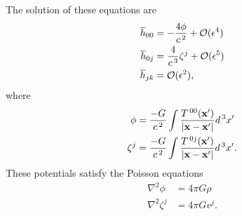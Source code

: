 The solution of these equations are
\begin{subequations}
	\begin{align}
	\label{eq: newpotentialandh00}
 			\overline h_{00} &= -\frac{4\phi}{c^{\hspace{0.05cm}2}} + \mathcal{O}(\epsilon^4) \\
 			\overline h_{0j} &= \frac{4}{c^{\hspace{0.05cm}3}}\zeta^j + \mathcal{O}(\epsilon^5) \\
  			\overline h_{jk} &= \mathcal{O}(\epsilon^2),
	\end{align}
\end{subequations}
where
\begin{subequations}
\begin{align}
 			\phi &= \frac{-G}{c^{\hspace{0.05cm}2}}\int \frac{T^{\hspace{0.05cm}00}(\mathbf{x'})}{|\mathbf{x}-\mathbf{x'}|}d^{\hspace{0.05cm}3}x'\\
	\label{eq: vector potential}
 			\zeta^j &= \frac{-G}{c^{\hspace{0.05cm}2}}\int \frac{T^{\hspace{0.05cm}0j}(\mathbf{x'})}{|\mathbf{x}-\mathbf{x'}|}d^{\hspace{0.05cm}3}x' .
	\end{align}
\end{subequations}
These potentials satisfy the Poisson equations
\begin{align}
\nabla^2 \phi &= 4\pi G\rho\\
\nabla^2 \zeta^j &= 4\pi G v^j.
\end{align}


